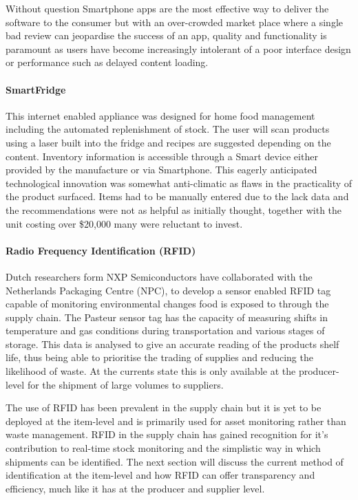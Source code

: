 \documentclass[a4paper, 11pt]{article}
\begin{document}
Without question Smartphone apps are the most effective way to deliver the software to the consumer but with an over-crowded market place where a single bad review can jeopardise the success of an app, quality and functionality is paramount as users have become increasingly intolerant of a poor interface design or performance such as delayed content loading.

\paragraph{SmartFridge}
This internet enabled appliance was designed for home food management including the automated replenishment of stock. The user will scan products using a laser built into the fridge and recipes are suggested depending on the content. Inventory information is accessible through a Smart device either provided by the manufacture or via Smartphone. This eagerly anticipated technological innovation was somewhat anti-climatic as flaws in the practicality of the product surfaced. Items had to be manually entered due to the lack data and the recommendations were not as helpful as initially thought, together with the unit costing over \$20,000 many were reluctant to invest.

\paragraph{Radio Frequency Identification (RFID)}
Dutch researchers form NXP Semiconductors have collaborated with the Netherlands Packaging Centre (NPC),  to develop a sensor enabled RFID tag capable of monitoring environmental changes food is exposed to through the supply chain.\cite{rfidFood} The Pasteur sensor tag has the capacity of measuring shifts in temperature and gas conditions during transportation and various stages of storage. This data is analysed to give an accurate reading of the products shelf life, thus being able to prioritise the trading of supplies and reducing the likelihood of waste. At the currents state this is only available at the producer-level for the shipment of large volumes to suppliers.

The use of RFID has been prevalent in the supply chain but it is yet to be deployed at the item-level and is primarily used for asset monitoring rather than waste management. RFID in the supply chain has gained recognition for it's contribution to real-time stock monitoring and the simplistic way in which shipments can be identified. The next section will discuss the current method of identification at the item-level and how RFID can offer transparency and efficiency, much like it has at the producer and supplier level.
\end{document}

